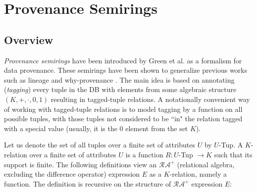 \section{Provenance Semirings}\label{sec:semiring provenance}
\subsection{Overview}\footnotemark
{}
\textit{Provenance semirings} have been introduced by Green et al. \cite{green2007provenance} as a formalism for data provenance. These semirings have been shown \cite{Karvounarakis:2012:SDQ:2380776.2380778} to generalize previous works such as lineage \cite{Cui:2000:TLV:357775.357777} and why-provenance \cite{DBLP:conf/icdt/BunemanKT01}. The main idea is based on annotating (\textit{tagging}) every tuple in the DB with elements from some algebraic structure $(K,+,\cdot,0,1)$\footnotemark
{}
resulting in tagged-tuple relations.
A notationally convenient way of working with tagged-tuple relations is to model tagging by a function on all possible tuples, with those tuples not considered to be ``in" the relation tagged with a special value (usually, it is the $0$ element from the set $K$).
\par Let us denote the set of all tuples over a finite set of attributes $U$ by $U$-Tup.
A $K$-relation over a finite set of attributes $U$ is a function $R: U$-Tup $\rightarrow K$ such that its support\footnotemark\hspace{0.2mm} is finite.
The following definitions view an $\mathcal{RA^+}$ (relational algebra, excluding the difference operator) expression $E$ as a $K$-relation, namely a function. The definition is recursive on the structure of $\mathcal{RA^+}$ expression $E$:
